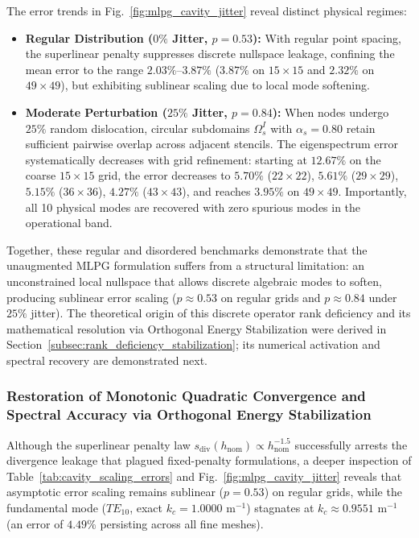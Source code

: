 \documentclass[preprint,12pt]{elsarticle}
\begin{document}
The error trends in Fig.~\ref{fig:mlpg_cavity_jitter} reveal distinct physical regimes:
\begin{itemize}
    \item \textbf{Regular Distribution ($0\%$ Jitter, $p = 0.53$):} With regular point spacing, the superlinear penalty suppresses discrete nullspace leakage, confining the mean error to the range $2.03\%\text{--}3.87\%$ ($3.87\%$ on $15\times 15$ and $2.32\%$ on $49\times 49$), but exhibiting sublinear scaling due to local mode softening.
    \item \textbf{Moderate Perturbation ($25\%$ Jitter, $p = 0.84$):} When nodes undergo $25\%$ random dislocation, circular subdomains $\Omega_s^I$ with $\alpha_s = 0.80$ retain sufficient pairwise overlap across adjacent stencils. The eigenspectrum error systematically decreases with grid refinement: starting at $12.67\%$ on the coarse $15 \times 15$ grid, the error decreases to $5.70\%$ ($22\times 22$), $5.61\%$ ($29\times 29$), $5.15\%$ ($36\times 36$), $4.27\%$ ($43\times 43$), and reaches $\mathbf{3.95\%}$ on $49 \times 49$. Importantly, all 10 physical modes are recovered with zero spurious modes in the operational band.
\end{itemize}

Together, these regular and disordered benchmarks demonstrate that the unaugmented MLPG formulation suffers from a structural limitation: an unconstrained local nullspace that allows discrete algebraic modes to soften, producing sublinear error scaling ($p \approx 0.53$ on regular grids and $p \approx 0.84$ under $25\%$ jitter). The theoretical origin of this discrete operator rank deficiency and its mathematical resolution via Orthogonal Energy Stabilization were derived in Section~\ref{subsec:rank_deficiency_stabilization}; its numerical activation and spectral recovery are demonstrated next.

\subsubsection{Restoration of Monotonic Quadratic Convergence and Spectral Accuracy via Orthogonal Energy Stabilization}
\label{subsubsec:resolution_stagnation_stabilization}

Although the superlinear penalty law $s_{\mathrm{div}}(h_{\mathrm{nom}}) \propto h_{\mathrm{nom}}^{-1.5}$ successfully arrests the divergence leakage that plagued fixed-penalty formulations, a deeper inspection of Table~\ref{tab:cavity_scaling_errors} and Fig.~\ref{fig:mlpg_cavity_jitter} reveals that asymptotic error scaling remains sublinear ($p = 0.53$) on regular grids, while the fundamental mode ($TE_{10}$, exact $k_c = 1.0000\text{ m}^{-1}$) stagnates at $k_c \approx 0.9551\text{ m}^{-1}$ (an error of $4.49\%$ persisting across all fine meshes).
\end{document}

